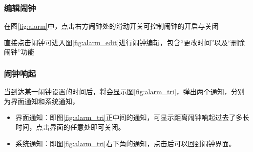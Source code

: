 \documentclass[a4paper,11pt]{article}
\begin{document}
\subsubsection{编辑闹钟}
在图\ref{fig:alarm}中，点击右方闹钟处的滑动开关可控制闹钟的开启与关闭

直接点击闹钟可进入图\ref{fig:alarm_edit}进行闹钟编辑，包含“更改时间”以及“删除闹钟”功能
\subsubsection{闹钟响起}\label{subsec:alarm}
当到达某一闹钟设置的时间后，将会显示图\ref{fig:alarm_tri}，弹出两个通知，分别为界面通知和系统通知，

\begin{itemize}
  \item 界面通知：即图\ref{fig:alarm_tri}正中间的通知，可显示距离闹钟响起过去了多长时间，点击界面的任意处即可关闭。
  \item 系统通知：即图\ref{fig:alarm_tri}右下角的通知，点击后可以回到闹钟界面。
\end{itemize}
\end{document}
